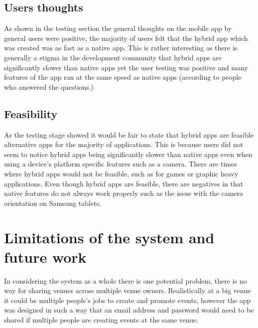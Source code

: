 \subsection{Users thoughts}
As shown in the testing section the general thoughts on the mobile app by general users were positive, the majority of users felt that the hybrid app which was created was as fast as a native app. This is rather interesting as there is generally a stigma in the development community that hybrid apps are significantly slower than native apps yet the user testing was positive and many features of the app ran at the same speed as native apps (according to people who answered the questions.) 

\subsection{Feasibility}
As the testing stage showed it would be fair to state that hybrid apps are feasible alternative apps for the majority of applications. This is because users did not seem to notice hybrid apps being significantly slower than native apps even when using a device's platform specific features such as a camera. There are times where hybrid apps would not be feasible, such as for games or graphic heavy applications. Even though hybrid apps are feasible, there are negatives in that native features do not always work properly such as the issue with the camera orientation on Samsung tablets.

\section{Limitations of the system and future work}
In considering the system as a whole there is one potential problem, there is no way for sharing venues across multiple venue owners. Realistically at a big venue it could be multiple people's jobs to create and promote events, however the app was designed in such a way that an email address and password would need to be shared if multiple people are creating events at the same venue.

